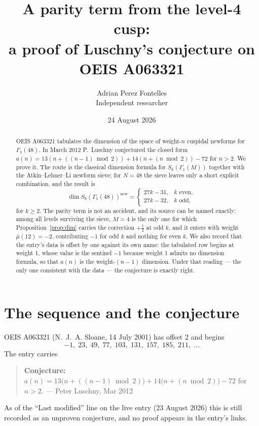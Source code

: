 \documentclass[11pt,a4paper]{article}
\title{A parity term from the level-4 cusp:\\
a proof of Luschny's conjecture on OEIS A063321}
\author{Adrian Perez Fontelles\\ \small Independent researcher}
\date{24 August 2026}
\theoremstyle{plain}
\theoremstyle{definition}
\begin{document}
\maketitle

\begin{abstract}
OEIS A063321 tabulates the dimension of the space of weight-$n$ cuspidal newforms for
$\Gamma_{1}(48)$. In March 2012 P.~Luschny conjectured the closed form
$a(n)=13(n+((n-1)\bmod2))+14(n+(n\bmod2))-72$ for $n>2$. We prove it. The route is the
classical dimension formula for $S_{k}(\Gamma_{1}(M))$ together with the
Atkin--Lehner--Li newform sieve; for $N=48$ the sieve leaves only a short explicit
combination, and the result is
\[
  \dim S_{k}(\Gamma_{1}(48))^{\mathrm{new}}=\begin{cases}27k-31,&k\text{ even},\\
  27k-32,&k\text{ odd},\end{cases}
\]
for $k\ge2$. The parity term is not an accident, and its source can be named exactly: among
all levels surviving the sieve, $M=4$ is the only one for which
Proposition~\ref{prop:dim} carries the correction $+\tfrac12$ at odd $k$, and it enters
with weight $\bar\mu(12)=-2$, contributing $-1$ for odd $k$ and nothing for even $k$. We
also record that the entry's data is offset by one against its own name: the tabulated row
begins at weight 1, whose value is the sentinel $-1$ because weight 1 admits no dimension
formula, so that $a(n)$ is the weight-$(n-1)$ dimension. Under that reading --- the only
one consistent with the data --- the conjecture is exactly right.
\end{abstract}

\section{The sequence and the conjecture}

OEIS A063321 (N.~J.~A. Sloane, 14 July 2001) has offset 2 and begins
\[
  -1,\;23,\;49,\;77,\;103,\;131,\;157,\;185,\;211,\;\dots
\]
The entry carries

\begin{quote}
\textbf{Conjecture:} $a(n)=13\bigl(n+((n-1)\bmod2)\bigr)+14\bigl(n+(n\bmod2)\bigr)-72$ for
$n>2$. --- Peter Luschny, Mar 2012
\end{quote}

As of the ``Last modified'' line on the live entry (23 August 2026) this is still recorded
as an unproven conjecture, and no proof appears in the entry's links.
\end{document}
